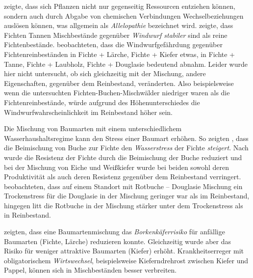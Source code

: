 \documentclass[twocolumn]{scrartcl}
\begin{document}
\cite{molisch1937allelopathie} zeigte, dass sich Pflanzen nicht nur
gegenseitig Ressourcen entziehen können, sondern auch durch Abgabe von
chemischen Verbindungen Wechselbeziehungen auslösen können, was
allgemein als \emph{Allelopathie} bezeichnet wird.
\cite{schmidtVogt1987Sturmstabilitaet} zeigte, dass Fichten Tannen
Mischbestände gegenüber \emph{Windwurf stabiler} sind als reine
Fichtenbestände. \cite{schuetz2006stabilitaetMischbestand}
beobachteten, dass die Windwurfgefährdung gegenüber
Fichtenreinbeständen in Fichte + Lärche, Fichte + Kiefer etwas, in
Fichte + Tanne, Fichte + Laubholz, Fichte + Douglasie bedeutend
abnahm. Leider wurde hier nicht untersucht, ob sich gleichzeitig mit
der Mischung, andere Eigenschaften, gegenüber dem Reinbestand,
veränderten. Also beispielsweise wenn die untersuchten
Fichten-Buchen-Mischwälder niedriger waren als die
Fichtenreinbestände, würde aufgrund des Höhenunterschiedes die
Windwurfwahrscheinlichkeit im Reinbestand höher sein.

Die Mischung von Baumarten mit einem unterschiedlichem
Wasserhaushaltsregime kann den Stress einer Baumart erhöhen. So
zeigten \cite{schume2004wasserFichteBuche}, dass die Beimischung von
Buche zur Fichte den \emph{Wasserstress} der Fichte
\emph{steigert}. Nach \cite{nothdurft2020mischbestand} wurde die
Resistenz der Fichte durch die Beimischung der Buche reduziert und bei
der Mischung von Eiche und Weißkiefer wurde bei beiden sowohl deren
Produktivität als auch deren Resistenz gegenüber dem Reinbestand
verringert. \cite{thurm2016mischungDougBuStress} beobachteten, dass
auf einem Standort mit Rotbuche -- Douglasie Mischung ein
Trockenstress für die Douglasie in der Mischung geringer war als im
Reinbestand, hingegen litt die Rotbuche in der Mischung stärker unter
dem Trockenstress als in Reinbestand.

\cite{sylvie2021mischwaldInsekten} zeigten, dass eine
Baumartenmischung das \emph{Borkenkäferrisiko} für anfällige Baumarten
(Fichte, Lärche) reduzieren konnte. Gleichzeitig wurde aber das Risiko
für weniger attraktive Baumarten (Kiefer) erhöht. Krankheitserreger
mit obligatorischem \emph{Wirtswechsel}, beispielsweise
Kieferndrehrost zwischen Kiefer und Pappel, können sich in
Mischbeständen besser verbreiten.
\end{document}
